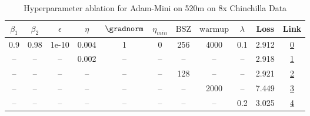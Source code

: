 \begin{table}[H]
\centering
\caption{Hyperparameter ablation for Adam-Mini on 520m on 8x Chinchilla Data}
\label{tab:ablation_adam-mini_520m_on_8x_chinchilla_data}
\begin{tabular}{ccccccccccc}
\toprule
$\beta_1$ & $\beta_2$ & $\epsilon$ & $\eta$ & $\gradnorm$ & $\eta_{min}$ & $\mathrm{BSZ}$ & $\mathrm{warmup}$ & $\lambda$ & Loss & Link \\
\midrule
0.9 & 0.98 & 1e-10 & 0.004 & 1 & 0 & 256 & 4000 & 0.1 & 2.912 & \href{https://wandb.ai/stanford-mercury/optimizer-scaling/runs/sweep-520m-85B-minidfe5aclr0.004-wd0.1-minlr0-warmup4000-b10.9-b-a76572}{0} \\
\midrule
-- & -- & -- & 0.002 & -- & -- & -- & -- & -- & 2.918 & \href{https://wandb.ai/stanford-mercury/optimizer-scaling/runs/sweep-520m-85B-mini6bf656lr0.002-wd0.1-minlr0-warmup4000-b10.9-b-aa645d}{1} \\
-- & -- & -- & -- & -- & -- & 128 & -- & -- & 2.921 & \href{https://wandb.ai/stanford-mercury/optimizer-scaling/runs/sweep-520m-85B-mini6698b4lr0.004-wd0.1-minlr0-warmup4000-b10.9-b-0f2989}{2} \\
-- & -- & -- & -- & -- & -- & -- & 2000 & -- & 7.449 & \href{https://wandb.ai/stanford-mercury/optimizer-scaling/runs/sweep-520m-85B-minib765f6lr0.004-wd0.1-minlr0-warmup2000-b10.9-b-e401ae}{3} \\
-- & -- & -- & -- & -- & -- & -- & -- & 0.2 & 3.025 & \href{https://wandb.ai/stanford-mercury/optimizer-scaling/runs/sweep-520m-85B-miniba6697lr0.004-wd0.2-minlr0-warmup4000-b10.9-b-137303}{4} \\
\bottomrule
\end{tabular}
\end{table}

